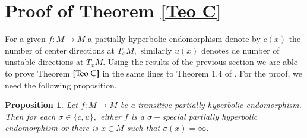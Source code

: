 \documentclass[12pt,reqno]{amsart}
\numberwithin{equation}{section}
\theoremstyle{plain}
\newtheorem{proposition}[theorem]{Proposition}
\theoremstyle{remark}
\begin{document}
\section{Proof of Theorem \ref{Teo C}  }
For a given $f:M \rightarrow M$  a partially hyperbolic endomorphism denote by $c(x)$ the number of center directions at $T_xM,$ similarly $u(x)$ denotes de number of unstable directions at $T_xM.$ Using the results of the previous section we are able to prove Theorem $\ref{Teo C}$ in the same lines to Theorem 1.4 of \cite{MT16}.
For the proof, we need the following proposition.


\begin{proposition}
Let $f:M\rightarrow M$ be a transitive partially hyperbolic endomorphism. Then for each $\sigma\in \{c,u\},$
either $f$ is a $\sigma-$special partially hyperbolic endomorphism or there is $x\in M$ such that $\sigma(x)=\infty.$

\end{proposition}
\end{document}
